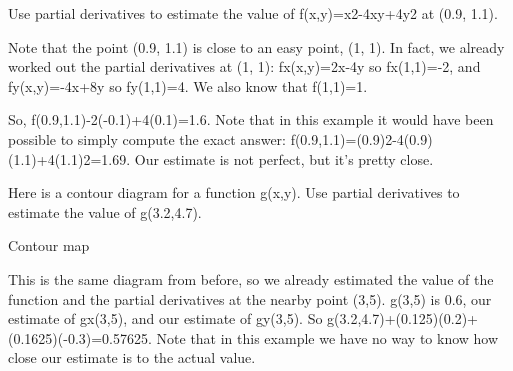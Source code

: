 \begin{example}
Use partial derivatives to estimate the value of f(x,y)=x2-4xy+4y2 at (0.9, 1.1).

\begin{solution}
  Note that the point (0.9, 1.1) is close to an easy point, (1, 1). In fact, we already worked out the partial derivatives at (1, 1): fx(x,y)=2x-4y so fx(1,1)=-2, and fy(x,y)=-4x+8y so fy(1,1)=4. We also know that f(1,1)=1.

So,
f(0.9,1.1)-2(-0.1)+4(0.1)=1.6.
Note that in this example it would have been possible to simply compute the exact answer:
f(0.9,1.1)=(0.9)2-4(0.9)(1.1)+4(1.1)2=1.69.
Our estimate is not perfect, but it's pretty close.
\end{solution}\end{example}

\begin{example}
Here is a contour diagram for a function g(x,y). Use partial derivatives to estimate the value of g(3.2,4.7).

Contour map
\begin{solution}
  This is the same diagram from before, so we already estimated the value of the function and the partial derivatives at the nearby point (3,5). g(3,5) is 0.6, our estimate of gx(3,5), and our estimate of gy(3,5). So
g(3.2,4.7)+(0.125)(0.2)+(0.1625)(-0.3)=0.57625.
Note that in this example we have no way to know how close our estimate is to the actual value.
\end{solution}\end{example}
